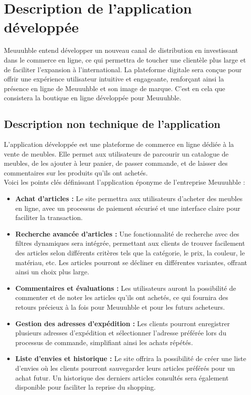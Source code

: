 \chapter{Description de l'application développée}

Meuuuhble entend développer un nouveau canal de distribution en investissant dans le
commerce en ligne, ce qui permettra de toucher une clientèle plus large et de faciliter l'expansion à
l'international. La plateforme digitale sera conçue pour offrir une expérience utilisateur intuitive et engageante,
renforçant ainsi la présence en ligne de Meuuuhble et son image de marque. C'est en cela que consistera la boutique en ligne développée pour Meuuuhble.

\section{Description non technique de l'application}

L'application développée est une plateforme de commerce en ligne dédiée à la vente de meubles. Elle permet aux utilisateurs de parcourir un catalogue de meubles, de les ajouter à leur panier, de passer commande, et de laisser des commentaires sur les produits qu'ils ont achetés.\\

Voici les points clés définissant l'application éponyme de l'entreprise Meuuuhble :
\begin{itemize}
	\item \textbf{Achat d'articles :} Le site permettra aux utilisateurs d'acheter des meubles en ligne, avec un processus
	de paiement sécurisé et une interface claire pour faciliter la transaction.
	\item \textbf{Recherche avancée d'articles : }Une fonctionnalité de recherche avec des filtres dynamiques sera
	intégrée, permettant aux clients de trouver facilement des articles selon différents critères tels que la catégorie, le prix, la couleur, le matériau, etc. Les articles pourront se décliner en différentes variantes, offrant ainsi un choix plus large.
	\item \textbf{Commentaires et évaluations :} Les utilisateurs auront la possibilité de commenter et de noter les	articles qu'ils ont achetés, ce qui fournira des retours précieux à la fois pour Meuuuhble et pour les futurs acheteurs.
	\item \textbf{Gestion des adresses d'expédition :} Les clients pourront enregistrer plusieurs adresses d'expédition et sélectionner l'adresse préférée lors du processus de commande, simplifiant ainsi les achats
	répétés.
	\item \textbf{Liste d'envies et historique :} Le site offrira la possibilité de créer une liste d'envies où les clients	pourront sauvegarder leurs articles préférés pour un achat futur. Un historique des derniers articles consultés sera également disponible pour faciliter la reprise du shopping.\\
\end{itemize}


